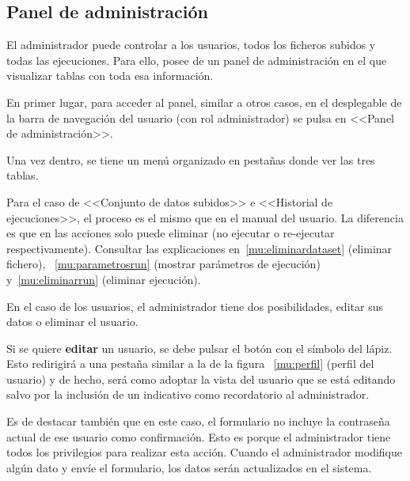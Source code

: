 \subsection{Panel de administración}

El administrador puede controlar a los usuarios, todos los ficheros subidos y
todas las ejecuciones. Para ello, posee de un panel de administración en el que
visualizar tablas con toda esa información.

En primer lugar, para acceder al panel, similar a otros casos, en el desplegable
de la barra de navegación del usuario (con rol administrador) se pulsa en
<<Panel de administración>>.


Una vez dentro, se tiene un menú organizado en pestañas donde ver las tres tablas.




Para el caso de <<Conjunto de datos subidos>> e <<Historial de ejecuciones>>, el
proceso es el mismo que en el manual del usuario. La diferencia es que en las
acciones solo puede eliminar (no ejecutar o re-ejecutar respectivamente).
Consultar las explicaciones  en~\ref{mu:eliminardataset} (eliminar fichero),
~\ref{mu:parametrosrun} (mostrar parámetros de ejecución) y~\ref{mu:eliminarrun}
(eliminar ejecución).

En el caso de los usuarios, el administrador tiene dos posibilidades, editar sus
datos o eliminar el usuario.

Si se quiere \textbf{editar} un usuario, se debe pulsar el botón con el símbolo
del lápiz. Esto redirigirá a una pestaña similar a la de la figura
~\ref{mu:perfil} (perfil del usuario) y de hecho, será como adoptar la vista del
usuario que se está editando salvo por la inclusión de un indicativo como
recordatorio al administrador.


Es de destacar también que en este caso, el formulario no incluye la contraseña
actual de ese usuario como confirmación. Esto es porque el administrador tiene
todos los privilegios para realizar esta acción. Cuando el administrador
modifique algún dato y envíe el formulario, los datos serán actualizados en el
sistema. 

